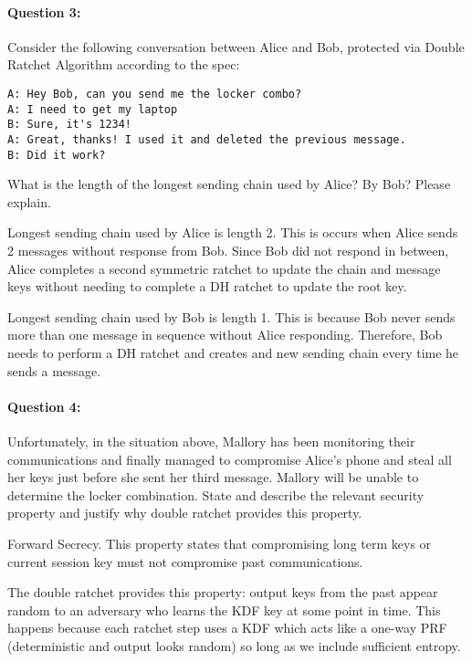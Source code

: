 \documentclass[12pt,letterpaper,twoside]{article}
\begin{document}
\paragraph{Question 3: } Consider the following conversation between Alice 
and Bob, protected via Double Ratchet Algorithm according to the spec:

\begin{verbatim}
A: Hey Bob, can you send me the locker combo?
A: I need to get my laptop
B: Sure, it's 1234!
A: Great, thanks! I used it and deleted the previous message.
B: Did it work?
\end{verbatim}

What is the length of the longest sending chain used by Alice? By Bob? 
Please explain.

{\color{purple} Longest sending chain used by Alice is length 2. This is 
occurs when Alice sends 2 messages without response from Bob. Since Bob 
did not respond in between, Alice completes a second symmetric ratchet 
to update the chain and message keys without needing to complete a DH 
ratchet to update the root key. }

{\color{purple} Longest sending chain used by Bob is length 1. This is 
because Bob never sends more than one message in sequence without Alice
responding. Therefore, Bob needs to perform a DH ratchet and creates and new 
sending chain every time he sends a message. }

\paragraph{Question 4: } Unfortunately, in the situation above, Mallory 
has been monitoring their communications and finally managed to compromise 
Alice's phone and steal all her keys just before she sent her third message.
Mallory will be unable to determine the locker combination. State and describe 
the relevant security property and justify why double ratchet provides this
property.

{\color{purple} Forward Secrecy. This property states that compromising long
term keys or current session key must not compromise past communications.

The double ratchet provides this property: output keys from the past appear 
random to an adversary who learns the KDF key at some point in time. This 
happens because each ratchet step uses a KDF which acts like a one-way 
PRF (deterministic and output looks random) so long as we include 
sufficient entropy. }
\end{document}
